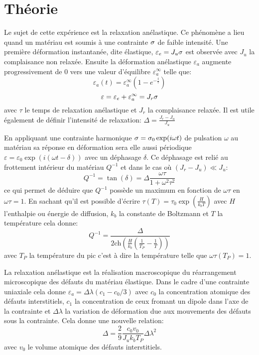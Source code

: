 \section{Théorie}

Le sujet de cette expérience est la relaxation anélastique. Ce phénomène a lieu quand un matériau est soumis à une contrainte $\sigma$ de faible intensité. Une première déformation instantanée, dite élastique, $\varepsilon_e = J_u \sigma$ est observée avec $J_u$ la complaisance non relaxée. Ensuite la déformation anélastique $\varepsilon_a$ augmente progressivement de $0$ vers une valeur d'équilibre $\varepsilon_a^\infty$ telle que:
\begin{equation}
    \varepsilon_a(t) = \varepsilon_a^\infty \left(1-e^{-\frac{t}{\tau}}\right)
\end{equation}
\begin{equation}
    \varepsilon = \varepsilon_e + \varepsilon_a^\infty = J_r \sigma
\end{equation}
avec $\tau$ le temps de relaxation anélastique et $J_r$ la complaisance relaxée. Il est utile également de définir l'intensité de relaxation: $\Delta = \frac{J_r - J_u}{J_u}$

En appliquant une contrainte harmonique $\sigma = \sigma_0 \exp(i\omega t)$ de pulsation $\omega$ au matériau sa réponse en déformation sera elle aussi périodique $\varepsilon = \varepsilon_0\exp(i(\omega t - \delta))$ avec un déphasage $\delta$. Ce déphasage est relié au frottement intérieur du matériau $Q^{-1}$ et dans le cas où $(J_r - J_u) \ll J_u$:
\begin{equation}
    Q^{-1} = \tan(\delta) = \Delta\frac{\omega\tau}{1+\omega^2\tau^2}
\end{equation}
ce qui permet de déduire que $Q^{-1}$ possède un maximum en fonction de $\omega\tau$ en $\omega\tau = 1$. En sachant qu'il est possible d'écrire $\tau(T) = \tau_0 \exp(\frac{H}{k_bT})$ avec $H$ l'enthalpie ou énergie de diffusion, $k_b$ la constante de Boltzmann et $T$ la température cela donne:
\begin{equation}
    Q^{-1} = \frac{\Delta}{2 \mathrm{ch}\left(\frac{H}{k_b}\left(\frac{1}{T_P}-\frac{1}{T}\right)\right)}
\end{equation}
avec $T_P$ la température du pic c'est à dire la température telle que $\omega\tau(T_P) = 1$.

La relaxation anélastique est la réalisation macroscopique du réarrangement microscopique des défauts du matériau élastique. Dans le cadre d'une contrainte uniaxiale cela donne \hbox{$\varepsilon_a = \Delta\lambda\left(c_1 - c_0/3\right)$} avec $c_0$ la concentration atomique des défauts interstitiels, $c_1$ la concentration de ceux fromant un dipole dans l'axe de la contrainte et $\Delta\lambda$ la variation de déformation due aux mouvements des défauts sous la contrainte. Cela donne une nouvelle relation:
\begin{equation}
    \Delta = \frac{2}{9}\frac{c_0 v_0}{J_u k_b T_P}\Delta\lambda^2
\end{equation}
avec $v_0$ le volume atomique des défauts interstitiels.
